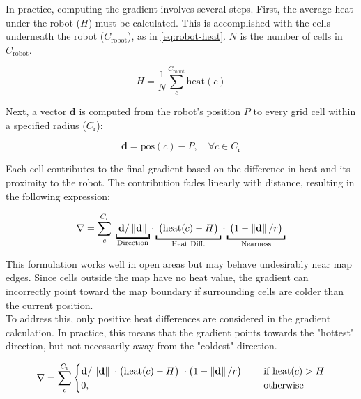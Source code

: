 In practice, computing the gradient involves several steps. First, the average heat under the robot ($H$) must be calculated. This is accomplished with the cells underneath the robot ($C_\mathrm{robot}$), as in \cref{eq:robot-heat}. $N$ is the number of cells in $C_\mathrm{robot}$.

\begin{equation}
\label{eq:robot-heat}
    H = \frac{1}{N} \sum_c^{C_\mathrm{robot}} \mathrm{heat}(c)
\end{equation}

Next, a vector $\mathbf{d}$ is computed from the robot's position $P$ to every grid cell within a specified radius ($C_\mathrm{r}$):

\begin{equation}
    \mathbf{d} = \mathrm{pos}(c) - P, \quad \forall c \in C_\mathrm{r}
\end{equation}

Each cell contributes to the final gradient based on the difference in heat and its proximity to the robot. The contribution fades linearly with distance, resulting in the following expression:

\begin{equation}
    \nabla = \sum_c^{C_\mathrm{r}} \;
    \underbracket{\; \mathbf{d}/\norm{\mathbf{d}}      \;}_\text{\makebox[0pt]{Direction}} \cdot
    \underbracket{\; \big(\mathrm{heat}(c) - H\big)    \;}_\text{Heat Diff.} \cdot
    \underbracket{\; \big(1 - \norm{\mathbf{d}}/r\big) \;}_\text{Nearness}
    \label{eq:fade-gradient}
\end{equation}

This formulation works well in open areas but may behave undesirably near map edges. Since cells outside the map have no heat value, the gradient can incorrectly point toward the map boundary if surrounding cells are colder than the current position.  \\

To address this, only positive heat differences are considered in the gradient calculation. In practice, this means that the gradient points towards the "hottest" direction, but not necessarily away from the "coldest" direction.

\begin{equation}
\label{eq:robot-gradient}
    \nabla = \sum_c^{C_\mathrm{r}}
    \begin{cases}
        \mathbf{d}/\left\lVert\mathbf{d}\right\rVert      \; \cdot
        \big(\mathrm{heat}(c) - H\big)    \; \cdot
        \big(1 - \left\lVert\mathbf{d}\right\rVert/r\big) \; \quad &\text{if } \mathrm{heat}(c) > H
        \\
        0, \quad &\text{otherwise}
    \end{cases}
\end{equation}


